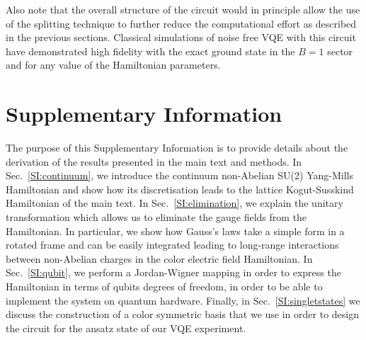 \documentclass[twocolumn,aps,showpacs,prb,superscriptaddress,floatfix,10pt,nofootinbib]{revtex4-2}
\begin{document}
Also note that the overall structure of the circuit would in principle allow the use of the splitting technique to further reduce the computational effort as described in the previous sections.
Classical simulations of noise free VQE with this circuit have demonstrated high fidelity with the exact ground state in the $B=1$ sector and for any value of the Hamiltonian parameters. 



\clearpage



\section*{Supplementary Information}
The purpose of this Supplementary Information is to provide details about the derivation of the results presented in the main text and methods. In Sec.~\ref{SI:continuum}, we introduce the continuum non-Abelian SU(2) Yang-Mills Hamiltonian and show how its discretisation leads to the lattice Kogut-Susskind Hamiltonian of the main text. In Sec.~\ref{SI:elimination}, we explain the unitary transformation which allows us to eliminate the gauge fields from the Hamiltonian. In particular, we show how Gauss's laws take a simple form in a rotated frame and can be easily integrated leading to long-range interactions between non-Abelian charges in the color electric field Hamiltonian. In Sec.~\ref{SI:qubit}, we perform a Jordan-Wigner mapping in order to express the Hamiltonian in terms of qubits degrees of freedom, in order to be able to implement the system on quantum hardware.  
Finally, in Sec.~\ref{SI:singletstates} we discuss the construction of a color symmetric basis that we use in order to design the circuit for the ansatz state of our VQE experiment. 
\end{document}
